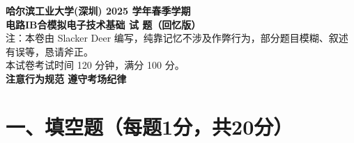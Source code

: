 \documentclass{article}
\begin{document}
\begin{center}
    \Large\textbf{哈尔滨工业大学(深圳) 2025 学年春季学期} \\[0.5em]
    \Huge\textbf{电路IB合模拟电子技术基础 试 题（回忆版）} \\[1em]
    \normalsize
    注：本卷由 Slacker Deer 编写，纯靠记忆不涉及作弊行为，部分题目模糊、叙述有误等，恳请斧正。 \\[0.3em]
    本试卷考试时间 120 分钟，满分 100 分。 \\[1em]
    \large\textbf{注意行为规范 遵守考场纪律}
\end{center}

\vspace{1em} %

\section*{一、填空题（每题1分，共20分）}
\end{document}
